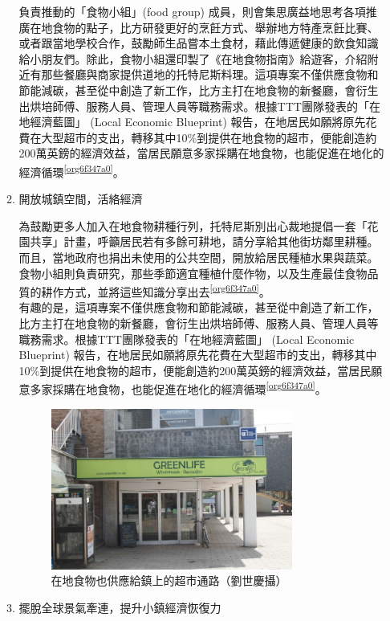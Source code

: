 \documentclass[a4paper,12pt]{article}
\begin{document}
\begin{enumerate}
\begin{enumerate}
負責推動的「食物小組」(food group) 成員，則會集思廣益地思考各項推廣在地食物的點子，比方研發更好的烹飪方式、舉辦地方特產烹飪比賽、或者跟當地學校合作，鼓勵師生品嘗本土食材，藉此傳遞健康的飲食知識給小朋友們。除此，食物小組還印製了《在地食物指南》給遊客，介紹附近有那些餐廳與商家提供道地的托特尼斯料理。這項專案不僅供應食物和節能減碳，甚至從中創造了新工作，比方主打在地食物的新餐廳，會衍生出烘培師傅、服務人員、管理人員等職務需求。根據TTT團隊發表的「在地經濟藍圖」 (Local Economic Blueprint) 報告，在地居民如願將原先花費在大型超市的支出，轉移其中10\%到提供在地食物的超市，便能創造約200萬英鎊的經濟效益，當居民願意多家採購在地食物，也能促進在地化的經濟循環\textsuperscript{\ref{org6f347a0}}。\\
\item 開放城鎮空間，活絡經濟
\label{sec:org3cbfc82}

為鼓勵更多人加入在地食物耕種行列，托特尼斯別出心裁地提倡一套「花園共享」計畫，呼籲居民若有多餘可耕地，請分享給其他街坊鄰里耕種。而且，當地政府也捐出未使用的公共空間，開放給居民種植水果與蔬菜。食物小組則負責研究，那些季節適宜種植什麼作物，以及生產最佳食物品質的耕作方式，並將這些知識分享出去\textsuperscript{\ref{org6f347a0}}。\\

有趣的是，這項專案不僅供應食物和節能減碳，甚至從中創造了新工作，比方主打在地食物的新餐廳，會衍生出烘培師傅、服務人員、管理人員等職務需求。根據TTT團隊發表的「在地經濟藍圖」 (Local Economic Blueprint) 報告，在地居民如願將原先花費在大型超市的支出，轉移其中10\%到提供在地食物的超市，便能創造約200萬英鎊的經濟效益，當居民願意多家採購在地食物，也能促進在地化的經濟循環\textsuperscript{\ref{org6f347a0}}。\\
\begin{figure}[htbp]
\centering
\includegraphics[width=300]{images/ttt.jpg}
\caption{\label{fig:ttt}在地食物也供應給鎮上的超市通路（劉世慶攝）}
\end{figure}
\item 擺脫全球景氣牽連，提升小鎮經濟恢復力
\label{sec:org54120fd}


\end{enumerate}
\end{enumerate}
\end{document}
